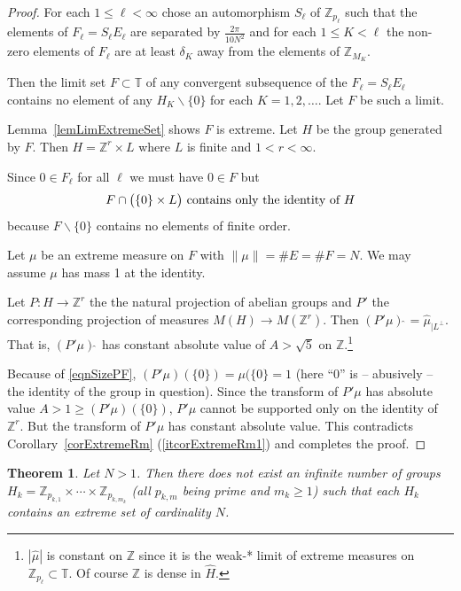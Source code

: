 \documentclass[letter,11pt]{amsart}
\numberwithin{theorem}{section}
\newtheorem{thm}[theorem]{Theorem}
\theoremstyle{remark}
\numberwithin{equation}{section}
\newcommand{\corref}[1]{Corollary~\ref{#1}}
\newcommand{\itemref}{\refitem}
\newcommand{\lemref}[1]{Lemma~\ref{#1}}
\newcommand{\refitem}[1]{(\ref{#1})}
\newcommand\itref\itemref
\newcommand{\T}{\text{$\mathbb T$}}
\newcommand{\Z}{\text{$\mathbb Z$}}
\newcommand\Zp[2]{\texttt{$\mathbb Z_{#1}^{\	#2}$}}
\begin{document}
\begin{proof}
 For each $1\le\ell<\infty$ chose an automorphism $S_\ell$ of \Zp{p_\ell}{} such
 that the elements of $F_\ell=S_\ell E_\ell$ are separated by $\frac{2\pi}{10N^2}$ and for each $1\le K<\ell$ the non-zero elements of $F_\ell$  are at least $\delta_K$
 away from the elements of \Zp{M_K}{}.
 
 Then the limit set $F\subset\T$ of any convergent subsequence of the
 $F_\ell= S_\ell E_\ell$ contains no element of any  $H_K\backslash \{0\}$
 for each $K=1, 2,\dots$.
Let $F$ be such a limit. 

\lemref{lemLimExtremeSet} shows $F$ is extreme. 
Let $H $ be the group generated by $F$. Then $H=\Z^{r}\times L$ where $L$ is finite and $1<r<\infty$.
 
 
  Since $0\in F_\ell$ for all $\ell$ we must have
   $0\in F$ but 
\begin{equation}\label{eqnSizePF}
F\cap  \big{(}{\{0\}\times L}{\big)} \text{ contains only the identity of } H
\end{equation}
because $F\backslash\{0\}$ contains no elements of finite order.

Let $\mu$ be an extreme measure on $F$ with $\|\mu\|=\#E=\#F=N$. 
We may assume $\mu$ has
mass 1 at the identity.
 
Let $P: H\rightarrow\Z^r$ 
the the natural projection of abelian groups and $ P'$ the corresponding
projection of measures  
$M(H)\rightarrow M(\Z^{r}).$ Then $(P'\mu)\widehat{\ }= \widehat\mu_{|L^\perp}$. That is,
$(P'\mu)\widehat{\ }$ has constant absolute value of $A>\sqrt 5$ on $\Z$.\footnote{$|\widehat\mu|$ is constant on $\Z$ since it is the weak-* limit of extreme measures 
on $\Zp{p_\ell}{}\subset\T$. Of course $\Z$ is dense in $\widehat H$.}

Because of \eqref{eqnSizePF}, $(P'\mu)(\{0\}) = \mu(\{0\}=1$  
(here ``0'' is -- abusively -- the identity of
the group in question). Since the transform of $P'\mu$ has absolute value $A>1\ge (P'\mu)(\{0\})$, $P'\mu$
cannot be supported only on the identity of $\Z^r$. But the transform of $P'\mu$ has
constant absolute value. This contradicts 
\corref{corExtremeRm} \itref{itcorExtremeRm1}
and completes the proof.
\end{proof}
 

\begin{thm}\label{thmLimExtremeSetPrimeProds}  Let $N>1$. Then there does not exist an 
infinite number of groups 
$H_k= \Zp{p_{k,1}}{}\times\cdots\times \Zp{p_{k, m_k}}{} $ (all $p_{k,m}$ being prime and $m_k\ge 1$) such
that   each $H_k$ contains
an extreme set
of cardinality $N$.
\end{thm}
\end{document}
